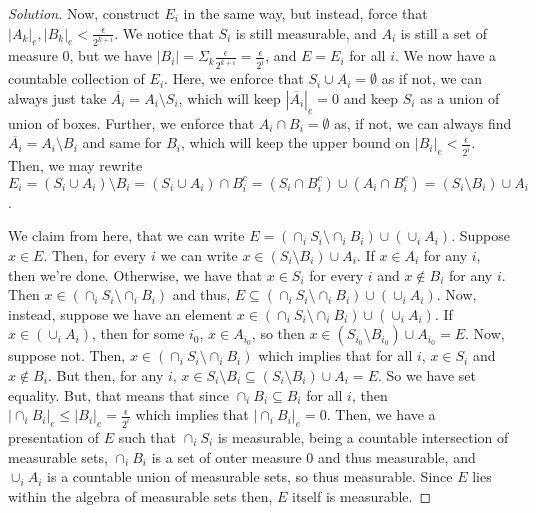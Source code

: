 \documentclass[10pt]{article}
\begin{document}
\begin{proof}[Solution]
Now, construct $E_i$ in the same way, but instead, force that $|A_k|_e,|B_k|_e < \frac{\epsilon}{2^{k + i}} $. We notice that $S_i$ is still measurable, and $A_i$ is still a set of measure 0, but we have $|B_i| = \Sigma_k \frac{\epsilon}{2^{k+i}} = \frac{\epsilon}{2^i}$, and $E = E_i$ for all $i$.  We now have a countable collection of $E_i$. Here, we enforce that $S_i \cup A_i = \emptyset$ as if not, we can always just take $\overline{A_i} = A_i \setminus S_i$, which will keep $|\overline{A_i}|_e = 0$ and keep $S_i$ as a union of union of boxes. Further, we enforce that $A_i \cap B_i = \emptyset$ as, if not, we can always find $\overline{A_i} = A_i \setminus B_i$ and same for $B_i$, which will keep the upper bound on $|B_i|_e <  \frac{\epsilon}{2^i}$. Then, we may rewrite $E_i = (S_i \cup A_i) \setminus B_i = (S_i \cup A_i) \cap B_i^c = (S_i \cap B_i^c) \cup (A_i \cap B_i^c) = (S_i \setminus B_i) \cup A_i$.


We claim from here, that we can write $E =  (\cap_i S_i \setminus \cap_i B_i) \cup (\cup_i A_i)$. Suppose $x \in E$. Then, for every $i$ we can write $x \in (S_i \setminus B_i) \cup A_i$. If $x \in A_i$ for any $i$, then we're done. Otherwise, we have that $x \in S_i$ for every $i$ and $x \not \in B_i$ for any $i$. Then $x \in  (\cap_i S_i \setminus \cap_i B_i)$ and thus, $E \subseteq  (\cap_i S_i \setminus \cap_i B_i) \cup (\cup_i A_i)$. Now, instead, suppose we have an element $x \in  (\cap_i S_i \setminus \cap_i B_i) \cup (\cup_i A_i)$. If $x \in (\cup_i A_i)$, then for some $i_0$, $x \in A_{i_0}$, so then $x \in (S_{i_0} \setminus B_{i_0}) \cup A_{i_0} = E$. Now, suppose not. Then, $x \in (\cap_i S_i \setminus \cap_i B_i)$ which implies that for all $i$, $x \in S_i$ and $x \not \in B_i$. But then, for any $i$, $x \in S_i \setminus B_i \subseteq  (S_i \setminus B_i) \cup A_i = E$. So we have set equality. But, that means that since $ \cap_i B_i \subseteq B_i$ for all $i$, then $|\cap_i B_i|_e \leq |B_i|_e =\frac{\epsilon}{2^i}$ which implies that $|\cap_i B_i|_e = 0$. Then, we have a presentation of $E$ such that $\cap_i S_i$ is measurable, being a countable intersection of measurable sets,  $\cap_i B_i$ is a set of outer measure 0 and thus measurable, and $\cup_i A_i$ is a countable union of measurable sets, so thus measurable. Since $E$ lies within the algebra of measurable sets then, $E$ itself is measurable. 


\end{proof}
\end{document}
